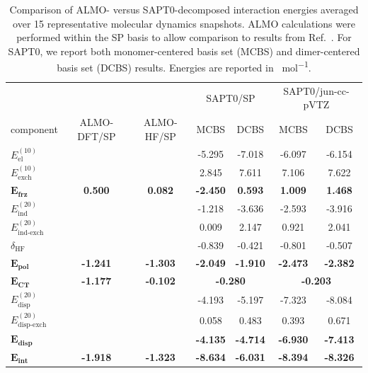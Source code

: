 \documentclass[%
  class = book,%
  crop = false,%
  float = true,%
  multi = true,%
  preview = false,%
]{standalone}
\begin{document}
\begin{table}
  \centering
  \caption[Comparison of ALMO and SAPT0 interaction energies for MD clusters]{Comparison of ALMO- versus SAPT0-decomposed interaction energies averaged over \num{15} representative molecular dynamics snapshots. ALMO calculations were performed within the SP basis to allow comparison to results from Ref.~\parencite{Brinzer2015}. For SAPT0, we report both monomer-centered basis set (MCBS) and dimer-centered basis set (DCBS) results. Energies are reported in \si{\kcal\per\mole}.}
  \label{paper_02:tab:6}
  \begin{tabular}{lcccccc}
    \toprule
    & & & \multicolumn{2}{c}{SAPT0/SP} & \multicolumn{2}{c}{SAPT0/jun-cc-pVTZ} \\
    \cmidrule{4-5} \cmidrule{6-7}
    component & ALMO-DFT/SP & ALMO-HF/SP & MCBS & DCBS & MCBS & DCBS \\
    \midrule
    \(E_{\text{el}}^{(10)}\) & \textemdash{} & \textemdash{} & -5.295 & -7.018 & -6.097 & -6.154 \\
    \(E_{\text{exch}}^{(10)}\) & \textemdash{} & \textemdash{} & 2.845 & 7.611 & 7.106 & 7.622 \\
    \(\mathbf{E_{\textbf{frz}}}\) & \textbf{0.500} & \textbf{0.082} & \textbf{-2.450} & \textbf{0.593} & \textbf{1.009} & \textbf{1.468} \\
    \(E_{\text{ind}}^{(20)}\) & \textemdash{} & \textemdash{} & -1.218 & -3.636 & -2.593 & -3.916 \\
    \(E_{\text{ind-exch}}^{(20)}\) & \textemdash{} & \textemdash{} & 0.009 & 2.147 & 0.921 & 2.041 \\
    \(\delta_{\text{HF}}\) & \textemdash{} & \textemdash{} & -0.839 & -0.421 & -0.801 & -0.507 \\
    \(\mathbf{E_{\textbf{pol}}}\) & \textbf{-1.241} & \textbf{-1.303} & \textbf{-2.049} & \textbf{-1.910} & \textbf{-2.473} & \textbf{-2.382} \\
    \(\mathbf{E_{\textbf{CT}}}\) & \textbf{-1.177} & \textbf{-0.102} & \multicolumn{2}{c}{\textbf{-0.280}} & \multicolumn{2}{c}{\textbf{-0.203}} \\
    \(E_{\text{disp}}^{(20)}\) & \textemdash{} & \textemdash{} & -4.193 & -5.197 & -7.323 & -8.084 \\
    \(E_{\text{disp-exch}}^{(20)}\) & \textemdash{} & \textemdash{} & 0.058 & 0.483 & 0.393 & 0.671 \\
    \(\mathbf{E_{\textbf{disp}}}\) & \textbf{\textemdash{}} & \textbf{\textemdash{}} & \textbf{-4.135} & \textbf{-4.714} & \textbf{-6.930} & \textbf{-7.413} \\
    \(\mathbf{E_{\textbf{int}}}\) & \textbf{-1.918} & \textbf{-1.323} & \textbf{-8.634} & \textbf{-6.031} & \textbf{-8.394} & \textbf{-8.326} \\
    \bottomrule
  \end{tabular}
\end{table}
\end{document}
